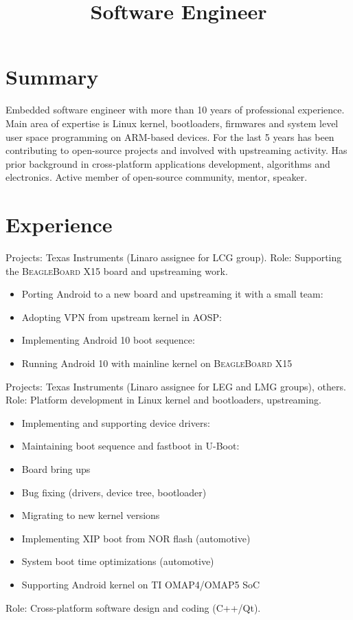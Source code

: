 \documentclass[11pt,a4paper]{moderncv}
\title{Software Engineer}
\begin{document}
\renewcommand*{\bibliographyhead}[1]{}

\maketitle

\section{Summary}

Embedded software engineer with more than 10 years of professional experience.
Main area of expertise is Linux kernel, bootloaders, firmwares and system level
user space programming on ARM-based devices. For the last 5 years has been
contributing to open-source projects and involved with upstreaming activity.
Has prior background in cross-platform applications development, algorithms and
electronics. Active member of open-source community, mentor, speaker.

\section{Experience}
  {Projects: Texas Instruments (Linaro assignee for LCG group). \newline{}
   Role: Supporting the \textsc{BeagleBoard X15} board and upstreaming work.
   \begin{itemize}
     \item Porting Android to a new board and upstreaming it with a small team:
           \cite{a}
     \item Adopting VPN from upstream kernel in AOSP: \cite{b}
     \item Implementing Android 10 boot sequence: \cite{c}
     \item Running Android 10 with mainline kernel on \textsc{BeagleBoard X15}
   \end{itemize}}
  {Projects: Texas Instruments (Linaro assignee for LEG and LMG groups), others. \newline{}
   Role: Platform development in Linux kernel and bootloaders, upstreaming.
   \begin{itemize}
     \item Implementing and supporting device drivers: \cite{d}
     \item Maintaining boot sequence and fastboot in U-Boot: \cite{e}
     \item Board bring ups
     \item Bug fixing (drivers, device tree, bootloader)
     \item Migrating to new kernel versions
     \item Implementing XIP boot from NOR flash (automotive)
     \item System boot time optimizations (automotive)
     \item Supporting Android kernel on TI OMAP4/OMAP5 SoC
   \end{itemize}
  }
  {Role: Cross-platform software design and coding (C++/Qt).}
\end{document}
